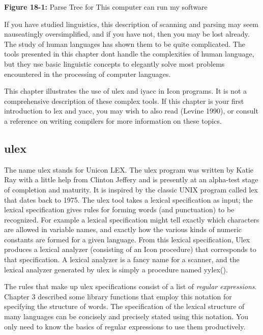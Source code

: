 {\sffamily\bfseries Figure 18-1:}
{\sffamily Parse Tree for {\textquotedbl}This computer can run my
software{\textquotedbl}}

\bigskip

If you have studied linguistics, this description of scanning and
parsing may seem nauseatingly oversimplified, and if you have not, then
you may be lost already.  The study of human languages has shown them
to be quite complicated.  The tools presented in this chapter
don{\textquotesingle}t handle the complexities of human language, but
they use basic linguistic concepts to elegantly solve most problems
encountered in the processing of computer languages.

This chapter illustrates the use of \textsf{ulex} and
\textsf{iyacc} in Icon programs. It is not a comprehensive description
of these complex tools. If this chapter is your first introduction to
\textsf{lex} and \textsf{yacc}, you may wish to also read (Levine
1990), or consult a reference on writing compilers for more information
on these topics.

\subsection{ulex}

The name \textsf{ulex} stands for Unicon LEX. The \textsf{ulex}
program was written by Katie Ray with a little help from Clinton Jeffery
and is presently at an alpha-test stage of completion and maturity.
It is inspired by
the classic UNIX program called \textsf{lex} that dates back to 1975. The
\textsf{ulex} tool takes a lexical specification as input; the lexical
specification gives rules for forming words (and punctuation) to
be recognized.  For example a lexical specification might tell exactly
which characters are allowed in variable names, and exactly how the
various kinds of numeric constants are formed for a given language.
From this lexical specification, Ulex produces a lexical
analyzer (consisting of an Icon procedure) that corresponds to that
specification. A lexical analyzer is a fancy name for a scanner, and the
lexical analyzer generated by \textsf{ulex} is simply a procedure named
\textsf{yylex()}.

The rules that make up
\textsf{ulex} specifications consist of a list of {\em regular expressions\/}.
Chapter 3 described some library functions that employ  this notation for specifying the structure
of words. The specification of the lexical structure of many languages
can be concisely and precisely stated using this notation. You only
need to know the basics of regular expressions to use them productively.

